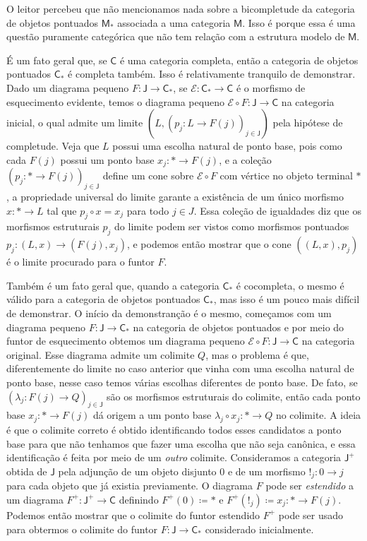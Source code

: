 \begin{obs}
  O leitor percebeu que não mencionamos nada sobre a bicompletude da categoria de objetos pontuados $\mathsf{M}_{*}$ associada a uma categoria $\mathsf{M}$.
  Isso é porque essa é uma questão puramente categórica que não tem relação com a estrutura modelo de $\mathsf{M}$.

  É um fato geral que, se $\mathsf{C}$ é uma categoria completa, então a categoria de objetos pontuados $\mathsf{C}_{*}$ é completa também.
  Isso é relativamente tranquilo de demonstrar.
  Dado um diagrama pequeno $F: \mathsf{J} \to \mathsf{C}_{*}$, se $\mathcal{E}: \mathsf{C}_{*} \to \mathsf{C}$ é o morfismo de esquecimento evidente, temos o diagrama pequeno $\mathcal{E} \circ F: \mathsf{J} \to \mathsf{C}$ na categoria inicial, o qual admite um limite $(L,(p_{j}: L \to F(j))_{j \in \mathsf{J}})$ pela hipótese de completude.
  Veja que $L$ possui uma escolha natural de ponto base, pois como cada $F(j)$ possui um ponto base $x_{j}: * \to F(j)$, e a coleção $(p_{j}: * \to F(j))_{j \in \mathsf{J}}$ define um cone sobre $\mathcal{E} \circ F$ com vértice no objeto terminal $*$, a propriedade universal do limite garante a existência de um único morfismo $x: * \to L$ tal que $p_{j} \circ x = x_{j}$ para todo $j \in J$.
  Essa coleção de igualdades diz que os morfismos estruturais $p_{j}$ do limite podem ser vistos como morfismos pontuados $p_{j}: (L,x) \to (F(j),x_{j})$, e podemos então mostrar que o cone $((L,x),p_{j})$ é o limite procurado para o funtor $F$.

  Também é um fato geral que, quando a categoria $\mathsf{C}_{*}$ é cocompleta, o mesmo é válido para a categoria de objetos pontuados $\mathsf{C}_{*}$, mas isso é um pouco mais difícil de demonstrar.
  O início da demonstranção é o mesmo, começamos com um diagrama pequeno $F: \mathsf{J} \to \mathsf{C}_{*}$ na categoria de objetos pontuados e por meio do funtor de esquecimento obtemos um diagrama pequeno $\mathcal{E} \circ F: \mathsf{J} \to \mathsf{C}$ na categoria original.
  Esse diagrama admite um colimite $Q$, mas o problema é que, diferentemente do limite no caso anterior que vinha com uma escolha natural de ponto base, nesse caso temos várias escolhas diferentes de ponto base.
  De fato, se $(\lambda_{j}: F(j) \to Q)_{j \in \mathsf{J}}$ são os morfismos estruturais do colimite, então cada ponto base $x_{j}: * \to F(j)$ dá origem a um ponto base $\lambda_{j} \circ x_{j}: * \to Q$ no colimite.
  A ideia é que o colimite correto é obtido identificando todos esses candidatos a ponto base para que não tenhamos que fazer uma escolha que não seja canônica, e essa identificação é feita por meio de um \emph{outro} colimite.
  Consideramos a categoria $\mathsf{J^{+}}$ obtida de $\mathsf{J}$ pela adjunção de um objeto disjunto $0$ e de um morfismo $!_{j}: 0 \to j$ para cada objeto que já existia previamente.
  O diagrama $F$ pode ser \emph{estendido} a um diagrama $F^{+}: \mathsf{J^{+}} \to \mathsf{C}$ definindo $F^{+}(0) \coloneqq *$ e $F^{+}(!_{j}) \coloneqq x_{j}: * \to F(j)$.
  Podemos então mostrar que o colimite do funtor estendido $F^{+}$ pode ser usado para obtermos o colimite do funtor $F: \mathsf{J} \to \mathsf{C}_{*}$ considerado inicialmente.
\end{obs}

